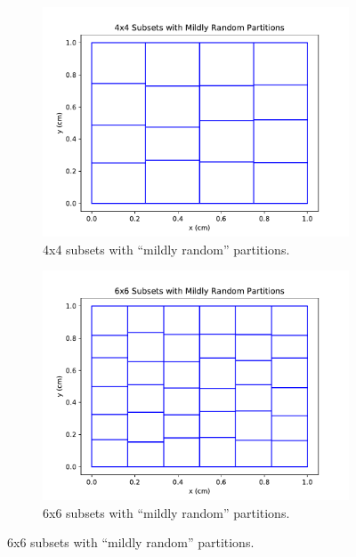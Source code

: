 \begin{figure}[H]
\centering
\begin{subfigure}[b]{0.45\textwidth}
  \includegraphics[width=\textwidth]{../cut_line_files/4_mild_random.pdf}
  \caption{4x4 subsets with ``mildly random'' partitions.}
  \label{4mildrandom}
\end{subfigure}
\begin{subfigure}[b]{0.45\textwidth}
  \includegraphics[width=\textwidth]{../cut_line_files/6_mild_random.pdf}
  \caption{6x6 subsets with ``mildly random'' partitions.}
  \label{6mildrandom}
\end{subfigure}


\end{figure}
